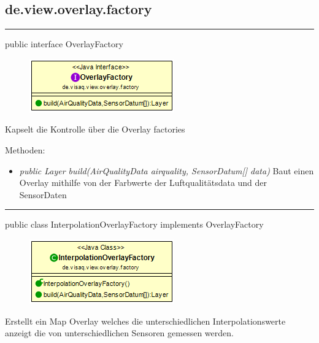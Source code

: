 \subsection{de.view.overlay.factory}

\rule{\textwidth}{0.4pt} 
public interface OverlayFactory 

\begin{minipage}{0.3\textwidth}
    \begin{figure}[H]
        \includegraphics[scale = 0.5
        ]{media/frontend/view/de.view.overlay.factory/OverlayFactory_Class.png}
    \end{figure}
    \end{minipage} \hfill
    \begin{minipage}{0.6\textwidth}
Kapselt die Kontrolle über die Overlay factories
\end{minipage}

Methoden:
\begin{itemize} 
    \item \emph{public Layer build(AirQualityData airquality, SensorDatum[] data)}  Baut einen Overlay mithilfe von der Farbwerte der Luftqualitätsdata und der SensorDaten
\end{itemize}

\rule{\textwidth}{0.4pt} 
public class InterpolationOverlayFactory implements OverlayFactory

\begin{minipage}{0.3\textwidth}
    \begin{figure}[H]
        \includegraphics[scale = 0.5]{media/frontend/view/de.view.overlay.factory/InterpolationOverlayFactory_Class.png}
    \end{figure}
    \end{minipage} \hfill
    \begin{minipage}{0.6\textwidth}
Erstellt ein Map Overlay welches die unterschiedlichen Interpolationswerte anzeigt die von unterschiedlichen Sensoren gemessen werden.
\end{minipage}

